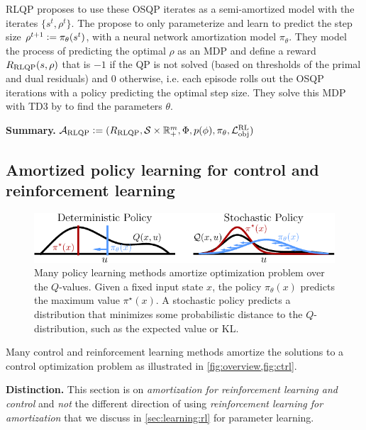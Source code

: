 \documentclass[twoside,11pt]{article}
\newcommand{\ie}{i.e.\xspace}
\begin{document}
RLQP proposes to use these OSQP iterates as a
semi-amortized model with the iterates
$\{s^t, \rho^t\}$. The propose to only parameterize and
learn to predict the step size
$\rho^{t+1}\vcentcolon= \pi_\theta(s^t)$, with a
neural network amortization model $\pi_\theta$.
They model the process of predicting the optimal $\rho$ as
an MDP and define a reward $R_{\rm RLQP}(s, \rho)$ that
is $-1$ if the QP is not solved
(based on thresholds of the primal and dual residuals)
and $0$ otherwise, \ie each episode rolls
out the OSQP iterations with a policy predicting
the optimal step size.
They solve this MDP with TD3 by \citet{fujimoto2018td3}
to find the parameters $\theta$.

\textbf{Summary.}
${\mathcal{A}}_{\rm RLQP}\vcentcolon= (R_{\rm RLQP}, {\mathcal{S}}\times\mathbb{R}^m_+, \Phi, p(\phi), \pi_\theta, {\mathcal{L}}^{\rm RL}_{\rm obj})$


\subsection{Amortized policy learning for control
  and reinforcement learning}
\label{sec:apps:ctrl}

\begin{figure}[t]
  \centering
  \includegraphics[width=\textwidth]{fig/ctrl.pdf}
  \caption{
    Many policy learning methods amortize
    optimization problem over the $Q$-values.
    Given a fixed input state $x$,
    the policy $\pi_\theta(x)$ predicts the
    maximum value $\pi^\star(x)$.
    A stochastic policy predicts
    a distribution that minimizes some probabilistic distance to
    the $Q$-distribution, such as the expected
    value or KL.
  }
  \label{fig:ctrl}
\end{figure}

Many control and reinforcement learning methods amortize the
solutions to a control optimization problem as illustrated in
\cref{fig:overview,fig:ctrl}.

\textbf{Distinction.} This section is on \emph{amortization for
reinforcement learning and control} and \emph{not} the
different direction of using \emph{reinforcement learning
for amortization} that we discuss in
\cref{sec:learning:rl} for parameter learning.
\end{document}
